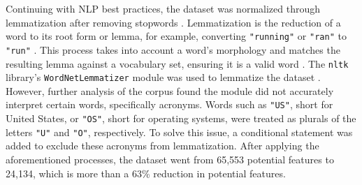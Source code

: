 \documentclass[12pt]{article}
\begin{document}
Continuing with NLP best practices, the dataset was normalized through lemmatization after removing stopwords \parencite{bird2009natural_lem}. Lemmatization is the reduction of a word to its root form or lemma, for example, converting \texttt{"running"} or \texttt{"ran"} to \texttt{"run"} \parencite{manning_raghavan_schütze_2009_stem_lem}. This process takes into account a word's morphology and matches the resulting lemma against a vocabulary set, ensuring it is a valid word \parencite{manning_raghavan_schütze_2009_stem_lem}. The \texttt{nltk} library's \texttt{WordNetLemmatizer} module was used to lemmatize the dataset \parencite{bird2009natural}. However, further analysis of the corpus found the module did not accurately interpret certain words, specifically acronyms. Words such as \texttt{"US"}, short for United States, or \texttt{"OS"}, short for operating systems, were treated as plurals of the letters \texttt{"U"} and \texttt{"O"}, respectively. To solve this issue, a conditional statement was added to exclude these acronyms from lemmatization. After applying the aforementioned processes, the dataset went from 65,553 potential features to 24,134, which is more than a 63\% reduction in potential features.
\end{document}
